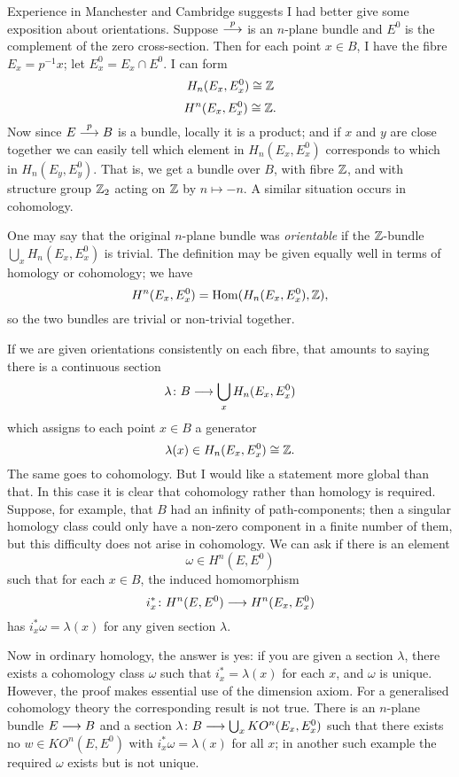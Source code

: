 \documentclass[../main]{subfiles}
\begin{document}
Experience in Manchester and Cambridge suggests I had better give some exposition about orientations. Suppose $\overset{p}{\longrightarrow}$ is an $n$-plane bundle and $E^0$ is the complement of the zero cross-section. Then for each point $x \in B$, I have the fibre $E_x = p^{-1}x$; let $E^0_x= E_x \cap E^0$. I can form
\[H_n(E_x,E_x^0) \cong \mathbb{Z} \]
\[H^n(E_x, E_x^0) \cong \mathbb{Z}.\]
Now since $E \overset{p}{\longrightarrow} B$ is a bundle, locally it is a product; and if $x$ and $y$ are close together we can easily tell which element in $H_n(E_x,E_x^0)$ corresponds to which in $H_n(E_y,E_y^0)$. That is, we get a bundle over $B$, with fibre $\mathbb{Z}$, and with structure group $\mathbb{Z}_2$ acting on $\mathbb{Z}$ by $n \mapsto -n$. A similar situation occurs in cohomology.

One may say that the original $n$-plane bundle was \emph{orientable} if the $\mathbb{Z}$-bundle $\bigcup_x H_n(E_x,E_x^0)$ is trivial. The definition may be given equally well in terms of homology or cohomology; we have
\[H^n(E_x,E_x^0) = \mathop{\mathrm{Hom}}(H_n(E_x,E_x^0),\mathbb{Z}),\]
so the two bundles are trivial or non-trivial together.

If we are given orientations consistently on each fibre, that amounts to saying there is a continuous section
\[\lambda \colon B \longrightarrow \bigcup_x H_n(E_x,E_x^0)\]
which assigns to each point $x \in B$ a generator 
\[\lambda(x) \in H_n(E_x,E_x^0) \cong \mathbb{Z}.\]
The same goes to cohomology. But I would like a statement more global than that. In this case it is clear that cohomology rather than homology is required. Suppose, for example, that $B$ had an infinity of path-components; then a singular homology class could only have a non-zero component in a finite number of them, but this difficulty does not arise in cohomology. We can ask if there is an element 
\[\omega \in H^n(E,E^0)\]
such that for each $x \in B$, the induced homomorphism 
\[i_x^* \colon H^n(E,E^0) \longrightarrow H^n(E_x,E_x^0)\]
has $i_x^* \omega = \lambda(x)$ for any given section $\lambda$.

Now in ordinary homology, the answer is yes: if you are given a section $\lambda$, there exists a cohomology class $\omega$ such that $i_x^* = \lambda(x)$ for each $x$, and $\omega$ is unique. However, the proof makes essential use of the dimension axiom. For a generalised cohomology theory the corresponding result is not true. There is an $n$-plane bundle $E \longrightarrow B$ and a section $\lambda \colon B \longrightarrow \bigcup_x KO^n(E_x,E_x^0)$ such that there exists no $w \in KO^n(E,E^0)$ with $i_x^* \omega = \lambda(x)$ for all $x$; in another such example the required $\omega$ exists but is not unique.
\end{document}
